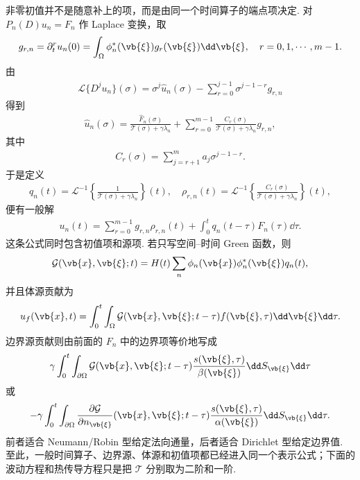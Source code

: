 非零初值并不是随意补上的项，而是由同一个时间算子的端点项决定. 对 $P_n(D)u_n=F_n$ 作 Laplace 变换，取
\begin{align*}
	g_{r,n}=\partial_t^r u_n(0)
	=\int_\Omega\phi_n^*(\vb{\xi})g_r(\vb{\xi})\dd\vb{\xi},
	\quad r=0,1,\cdots,m-1.
\end{align*}
由
\begin{align*}
	\mathcal{L}\{D^j u_n\}(\sigma)
	=\sigma^j\widehat{u}_n(\sigma)
	-\sum_{r=0}^{j-1}\sigma^{j-1-r}g_{r,n}
\end{align*}
得到
\begin{align*}
	\widehat{u}_n(\sigma)
	=\frac{\widehat{F}_n(\sigma)}{\mathcal{T}(\sigma)+\gamma\lambda_n}
	+\sum_{r=0}^{m-1}
	\frac{C_r(\sigma)}{\mathcal{T}(\sigma)+\gamma\lambda_n}g_{r,n},
\end{align*}
其中
\begin{align*}
	C_r(\sigma)=\sum_{j=r+1}^m a_j\sigma^{j-1-r}.
\end{align*}
于是定义
\begin{align*}
	q_n(t)=\mathcal{L}^{-1}\left\{
	\frac{1}{\mathcal{T}(\sigma)+\gamma\lambda_n}
	\right\}(t),
	\quad
\rho_{r,n}(t)=\mathcal{L}^{-1}\left\{
	\frac{C_r(\sigma)}{\mathcal{T}(\sigma)+\gamma\lambda_n}
	\right\}(t),
\end{align*}
便有一般解
\begin{align*}
	u_n(t)=\sum_{r=0}^{m-1}g_{r,n}\rho_{r,n}(t)
	+\int_0^tq_n(t-\tau)F_n(\tau)\dd\tau.
\end{align*}
这条公式同时包含初值项和源项. 若只写空间--时间 Green 函数，则
\begin{align*}
	\mathcal{G}(\vb{x},\vb{\xi};t)
	=H(t)\sum_n\phi_n(\vb{x})\phi_n^*(\vb{\xi})q_n(t),
\end{align*}
并且体源贡献为
\begin{align*}
	u_f(\vb{x},t)=\int_0^t\int_\Omega
	\mathcal{G}(\vb{x},\vb{\xi};t-\tau)f(\vb{\xi},\tau)
	\dd\vb{\xi}\dd\tau.
\end{align*}
边界源贡献则由前面的 $F_n$ 中的边界项等价地写成
\begin{align*}
	\gamma\int_0^t\int_{\partial\Omega}
	\mathcal{G}(\vb{x},\vb{\xi};t-\tau)
	\frac{s(\vb{\xi},\tau)}{\beta(\vb{\xi})}\dd S_{\vb{\xi}}\dd\tau
\end{align*}
或
\begin{align*}
	-\gamma\int_0^t\int_{\partial\Omega}
	\frac{\partial\mathcal{G}}{\partial n_{\vb{\xi}}}(\vb{x},\vb{\xi};t-\tau)
	\frac{s(\vb{\xi},\tau)}{\alpha(\vb{\xi})}\dd S_{\vb{\xi}}\dd\tau.
\end{align*}
前者适合 Neumann/Robin 型给定法向通量，后者适合 Dirichlet 型给定边界值. 至此，一般时间算子、边界源、体源和初值项都已经进入同一个表示公式；下面的波动方程和热传导方程只是把 $\mathcal{T}$ 分别取为二阶和一阶.

